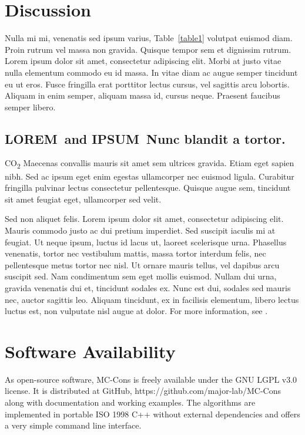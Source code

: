 \documentclass[10pt,letterpaper]{article}
\newcommand{\lorem}{{\bf LOREM}}
\newcommand{\ipsum}{{\bf IPSUM}}
\begin{document}
\newpage
\section*{Discussion}
Nulla mi mi, venenatis sed ipsum varius, Table~\ref{table1} volutpat euismod diam. Proin rutrum vel massa non gravida. Quisque tempor sem et dignissim rutrum. Lorem ipsum dolor sit amet, consectetur adipiscing elit. Morbi at justo vitae nulla elementum commodo eu id massa. In vitae diam ac augue semper tincidunt eu ut eros. Fusce fringilla erat porttitor lectus cursus, vel sagittis arcu lobortis. Aliquam in enim semper, aliquam massa id, cursus neque. Praesent faucibus semper libero.

\subsection*{\lorem\ and \ipsum\ Nunc blandit a tortor.}

CO\textsubscript{2} Maecenas convallis mauris sit amet sem ultrices gravida. Etiam eget sapien nibh. Sed ac ipsum eget enim egestas ullamcorper nec euismod ligula. Curabitur fringilla pulvinar lectus consectetur pellentesque. Quisque augue sem, tincidunt sit amet feugiat eget, ullamcorper sed velit. 

Sed non aliquet felis. Lorem ipsum dolor sit amet, consectetur adipiscing elit. Mauris commodo justo ac dui pretium imperdiet. Sed suscipit iaculis mi at feugiat. Ut neque ipsum, luctus id lacus ut, laoreet scelerisque urna. Phasellus venenatis, tortor nec vestibulum mattis, massa tortor interdum felis, nec pellentesque metus tortor nec nisl. Ut ornare mauris tellus, vel dapibus arcu suscipit sed. Nam condimentum sem eget mollis euismod. Nullam dui urna, gravida venenatis dui et, tincidunt sodales ex. Nunc est dui, sodales sed mauris nec, auctor sagittis leo. Aliquam tincidunt, ex in facilisis elementum, libero lectus luctus est, non vulputate nisl augue at dolor. For more information, see .

\section*{Software Availability} %
As open-source software, MC-Cons is freely available under the GNU LGPL v3.0 license. It is distributed at GitHub, https://github.com/major-lab/MC-Cons along with documentation and working examples. The algorithms are implemented in portable ISO 1998 C++ without external dependencies and offers a very simple command line interface.
\end{document}
